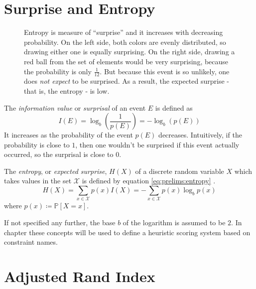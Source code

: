 		\clearpage

	\section{Surprise and Entropy}

		\begin{figure}[ht!]
			\centering
			
			\caption{Entropy is measure of \enquote{surprise} and it increases with decreasing probability. On the left side, both colors are evenly distributed, so drawing either one is equally surprising. On the right side, drawing a red ball from the set of elements would be very surprising, because the probability is only $\frac{1}{12}$. But because this event is so unlikely, one does \textit{not expect} to be surprised. As a result, the expected surprise - that is, the entropy - is low.}
			\label{figure:prelim:entropy}
		\end{figure}

		The \textit{information value} or \textit{surprisal} of an event $E$ is defined as
		\begin{equation}
			I(E) = \log_b \left( \frac{1}{p(E)} \right) = - \log_b \left( p(E) \right)
		\end{equation}
		It increases as the probability of the event $p(E)$ decreases.
		Intuitively, if the probability is close to $1$, then one wouldn't be surprised if this event actually occurred, so the surprisal is close to $0$.

		The \textit{entropy}, or \textit{expected surprise}, $H(X)$ of a discrete random variable $X$ which takes values in the set $\mathcal{X}$ is defined by equation \ref{eq:prelims:entropy} \cite{coverElementsInformationTheory2006}.
		\begin{equation}
		\label{eq:prelims:entropy}
			H(X) =  \sum_{x \in \mathcal{X}} p(x) I(X) = - \sum_{x \in \mathcal{X}} p(x) \log_b p(x)
		\end{equation}
		where $p(x) \coloneq \mathbb{P}[X = x]$.

		If not specified any further, the base $b$ of the logarithm is assumed to be $2$.
		In chapter  these concepts will be used to define a heuristic scoring system based on constraint names.

	\section{Adjusted Rand Index}
	\label{chap:prelims:rand}

